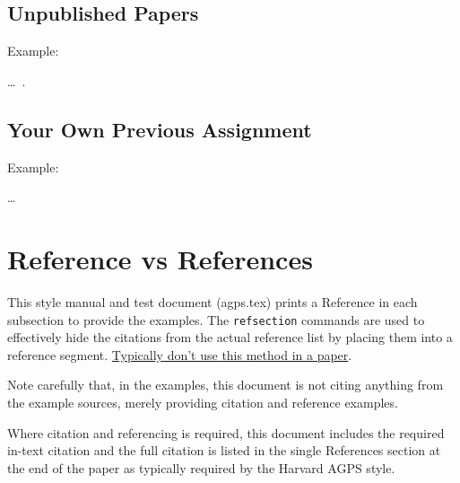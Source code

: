 \documentclass[a4paper, 11pt]{article}
\newcommand*{\subsectionRefSection}[1]{
    \subsection{#1}
    \refsection
}
\newcommand*{\printsubbibliographyEndRefSection}{
    \printbibliography[heading=subbibliography, title=Reference]
    \endrefsection
}
\newenvironment{agpsExample}{
    \setlength{\parindent}{0pt}
    \medskip
}
{}
\newenvironment{bareList}{%
    \begin{list}{}{}%
}
{\end{list}}
\begin{document}
\printsubbibliographyEndRefSection

\subsectionRefSection{Unpublished Papers}

\begin{agpsExample}

    Example:

    \begin{bareList}
        \item \ldots\ \autocite{Pomfret2001EconomDiversNew}.
    \end{bareList}

\end{agpsExample}

\printsubbibliographyEndRefSection

\subsectionRefSection{Your Own Previous Assignment}

\begin{agpsExample}

    Example:

    \begin{bareList}
        \item \Textcite[45]{Smith2018Assign1} \ldots
    \end{bareList}

\end{agpsExample}

\printsubbibliographyEndRefSection

\newpage
\section{Reference vs References}

This style manual and test document (agps.tex) prints a Reference in each subsection to provide the
examples. The \texttt{refsection} commands are used to effectively hide the citations from the
actual reference list by placing them into a reference segment. \underline{Typically don't use this
method in a paper}.

Note carefully that, in the examples, this document is not citing anything from the example sources,
merely providing citation and reference examples.

Where citation and referencing is required, this document includes the required in-text citation and
the full citation is listed in the single References section at the end of the paper as typically
required by the Harvard AGPS style.

\newpage
\printbibliography[heading=bibintoc]

\end{document}
